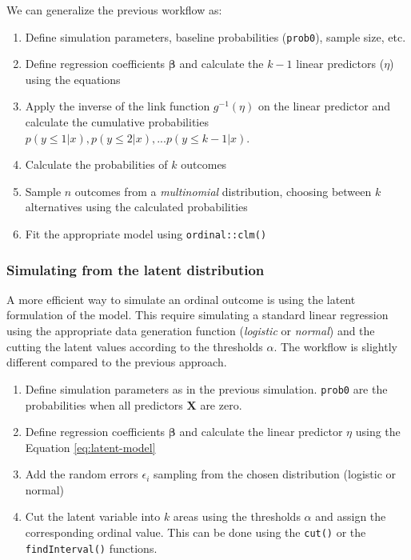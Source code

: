 \documentclass[
  man, mask,floatsintext]{apa6}
\providecommand{\tightlist}{%
  \setlength{\itemsep}{0pt}\setlength{\parskip}{0pt}}
\begin{document}
\normalsize

We can generalize the previous workflow as:

\begin{enumerate}
\def\labelenumi{\arabic{enumi}.}
\tightlist
\item
  Define simulation parameters, baseline probabilities (\texttt{prob0}), sample size, etc.
\item
  Define regression coefficients \(\boldsymbol{\beta}\) and calculate the \(k - 1\) linear predictors (\(\eta\)) using the equations
\item
  Apply the inverse of the link function \(g^{-1}(\eta)\) on the linear predictor and calculate the cumulative probabilities \(p(y \leq 1|x), p(y \leq 2|x), ... p(y \leq k - 1|x)\).
\item
  Calculate the probabilities of \(k\) outcomes
\item
  Sample \(n\) outcomes from a \emph{multinomial} distribution, choosing between \(k\) alternatives using the calculated probabilities
\item
  Fit the appropriate model using \texttt{ordinal::clm()}
\end{enumerate}

\subsubsection{Simulating from the latent distribution}\label{simulating-from-the-latent-distribution}

A more efficient way to simulate an ordinal outcome is using the latent formulation of the model. This require simulating a standard linear regression using the appropriate data generation function (\emph{logistic} or \emph{normal}) and the cutting the latent values according to the thresholds \(\alpha\). The workflow is slightly different compared to the previous approach.

\begin{enumerate}
\def\labelenumi{\arabic{enumi}.}
\tightlist
\item
  Define simulation parameters as in the previous simulation. \texttt{prob0} are the probabilities when all predictors \(\mathbf{X}\) are zero.
\item
  Define regression coefficients \(\boldsymbol{\beta}\) and calculate the linear predictor \(\eta\) using the Equation \eqref{eq:latent-model}
\item
  Add the random errors \(\epsilon_i\) sampling from the chosen distribution (logistic or normal)
\item
  Cut the latent variable into \(k\) areas using the thresholds \(\alpha\) and assign the corresponding ordinal value. This can be done using the \texttt{cut()} or the \texttt{findInterval()} functions.
\end{enumerate}
\end{document}
